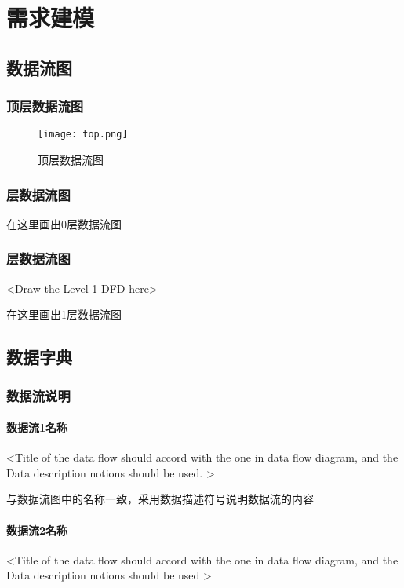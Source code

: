 \chapter{需求建模 }
\section{数据流图}
\subsection{顶层数据流图}

\begin{figure}[ht]
\centering
\texttt{[image: top.png]}
\caption{顶层数据流图}\label{fig:noted-figure}
\end{figure}

\subsection{层数据流图}

在这里画出0层数据流图
 
\subsection{层数据流图}
<Draw the Level-1 DFD here>

在这里画出1层数据流图

\section{数据字典}
\subsection{数据流说明}
\subsubsection{数据流1名称}
<Title of  the data flow should accord with the one in data flow diagram, and the Data description notions should be used.  >

与数据流图中的名称一致，采用数据描述符号说明数据流的内容

\subsubsection{数据流2名称}
<Title of  the data flow should accord with the one in data flow diagram, and the Data description notions should be used   >

